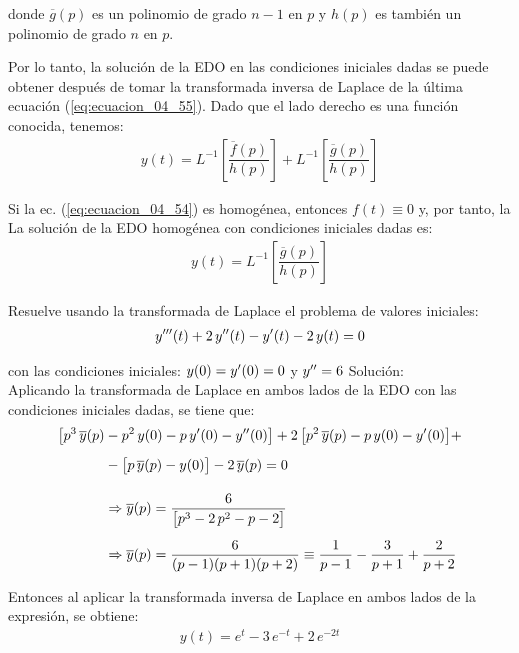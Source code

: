 donde $\overline{g}(p)$ es un polinomio de grado $n-1$ en $p$ y $h(p)$ es también un polinomio de grado $n$ en $p$.
\par
Por lo tanto, la solución de la EDO en las condiciones iniciales dadas se puede obtener después de tomar la transformada inversa de Laplace de la última ecuación (\ref{eq:ecuacion_04_55}). Dado que el lado derecho es una función conocida, tenemos:
\begin{align}
y(t) = L^{-1} \left[ \dfrac{\overline{f}(p)}{h(p)} \right] + L^{-1} \left[ \dfrac{\overline{g}(p)}{h(p)} \right]
\label{eq:ecuacion_04_56}
\end{align}

Si la ec. (\ref{eq:ecuacion_04_54}) es homogénea, entonces $f (t) \equiv 0$ y, por tanto, la La solución de la EDO homogénea con condiciones iniciales dadas es:
\begin{align}
y(t) = L^{-1} \left[ \dfrac{\overline{g}(p)}{h(p)} \right]
\label{eq:ecuacion_04_57}
\end{align}

\begin{ejemplo}
Resuelve usando la transformada de Laplace el problema de valores iniciales:
\begin{align*}
{y}^{\prime \prime \prime}(t) +  2 \, {y}^{\prime \prime} (t) - {y}^{\prime}(t) - 2 \, y(t) = 0
\end{align*}

con las condiciones iniciales: $y(0) = {y}^{\prime}(0) = 0$ y ${y}^{\prime \prime} = 6$
\noindent Solución:
\\[0.5em]
Aplicando la transformada de Laplace en ambos lados de la EDO con las condiciones iniciales dadas, se tiene que:
\begin{align*}
\big[p^{3} \, \overline{y}(p) &- p^{2} \, y(0) - p \, {y}^{\prime}(0) - {y}^{\prime \prime}(0) \big] + 2 \, \big[p^{2} \, \overline{y}(p) - p \, y(0) - {y}^{\prime}(0) \big] + \\[0.5em]
&- \big[p \, \overline{y}(p) - y(0) \big] - 2 \, \overline{y}(p) = 0 \\[1em]
&\Rightarrow \overline{y}(p) = \dfrac{6}{\big[p^{3} - 2 \, p^{2} - p -2 \big]} \\[0.5em]
&\Rightarrow \overline{y}(p) = \dfrac{6}{(p - 1)(p + 1)(p +2)} \equiv \dfrac{1}{p - 1} - \dfrac{3}{p + 1} + \dfrac{2}{p + 2}  
\end{align*}

Entonces al aplicar la transformada inversa de Laplace en ambos lados de la expresión, se obtiene:
\begin{align*}
y(t) = e^{t} - 3 \, e^{-t} + 2 \, e^{- 2 t}
\end{align*}
\end{ejemplo}

